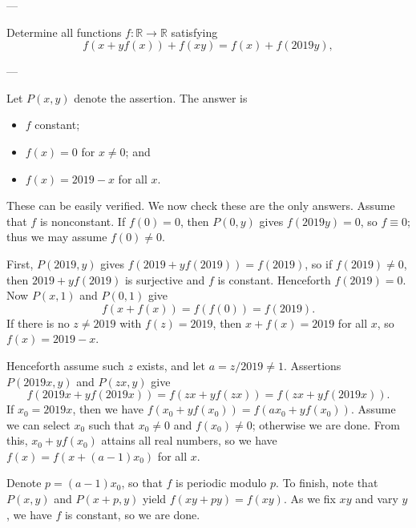 
---

Determine all functions $f:\mathbb R\to\mathbb R$ satisfying \[f(x+yf(x))+f(xy)=f(x)+f(2019y),\]

---

Let $P(x,y)$ denote the assertion. The answer is
\begin{itemize}[itemsep=0em]
    \item $f$ constant;
    \item $f(x)=0$ for $x\ne0$; and
    \item $f(x)=2019-x$ for all $x$.
\end{itemize}
These can be easily verified. We now check these are the only answers. Assume that $f$ is nonconstant. If $f(0)=0$, then $P(0,y)$ gives $f(2019y)=0$, so $f\equiv0$; thus we may assume $f(0)\ne0$.

First, $P(2019,y)$ gives $f(2019+yf(2019))=f(2019)$, so if $f(2019)\ne0$, then $2019+yf(2019)$ is surjective and $f$ is constant. Henceforth $f(2019)=0$. Now $P(x,1)$ and $P(0,1)$ give \[f(x+f(x))=f(f(0))=f(2019).\]
If there is no $z\ne2019$ with $f(z)=2019$, then $x+f(x)=2019$ for all $x$, so $f(x)=2019-x$.

Henceforth assume such $z$ exists, and let $a=z/2019\ne1$. Assertions $P(2019x,y)$ and $P(zx,y)$ give \[f(2019x+yf(2019x))=f(zx+yf(zx))=f(zx+yf(2019x)).\]
If $x_0=2019x$, then we have $f(x_0+yf(x_0))=f(ax_0+yf(x_0))$. Assume we can select $x_0$ such that $x_0\ne0$ and $f(x_0)\ne0$; otherwise we are done. From this, $x_0+yf(x_0)$ attains all real numbers, so we have $f(x)=f(x+(a-1)x_0)$ for all $x$.

Denote $p=(a-1)x_0$, so that $f$ is periodic modulo $p$. To finish, note that $P(x,y)$ and $P(x+p,y)$ yield $f(xy+py)=f(xy)$. As we fix $xy$ and vary $y$, we have $f$ is constant, so we are done.

